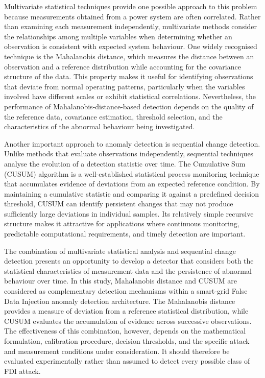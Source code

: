\documentclass[12pt,a4paper]{report}
\begin{document}
Multivariate statistical techniques provide one possible approach to this problem because
measurements obtained from a power system are often correlated. Rather than examining each
measurement independently, multivariate methods consider the relationships among multiple
variables when determining whether an observation is consistent with expected system behaviour.
One widely recognised technique is the Mahalanobis distance, which measures the distance
between an observation and a reference distribution while accounting for the covariance
structure of the data. This property makes it useful for identifying observations that
deviate from normal operating patterns, particularly when the variables involved have different
scales or exhibit statistical correlations. Nevertheless, the performance of Mahalanobis-distance-based
detection depends on the quality of the reference data, covariance estimation, threshold
selection, and the characteristics of the abnormal behaviour being investigated.

Another important approach to anomaly detection is sequential change detection. Unlike methods
that evaluate observations independently, sequential techniques analyse the evolution of a
detection statistic over time. The Cumulative Sum (CUSUM) algorithm is a well-established
statistical process monitoring technique that accumulates evidence of deviations from an
expected reference condition. By maintaining a cumulative statistic and comparing it against
a predefined decision threshold, CUSUM can identify persistent changes that may not produce
sufficiently large deviations in individual samples. Its relatively simple recursive structure
makes it attractive for applications where continuous monitoring, predictable computational
requirements, and timely detection are important.

The combination of multivariate statistical analysis and sequential change detection presents
an opportunity to develop a detector that considers both the statistical characteristics of
measurement data and the persistence of abnormal behaviour over time. In this study, Mahalanobis
distance and CUSUM are considered as complementary detection mechanisms within a smart-grid
False Data Injection anomaly detection architecture. The Mahalanobis distance provides a
measure of deviation from a reference statistical distribution, while CUSUM evaluates the
accumulation of evidence across successive observations. The effectiveness of this combination,
however, depends on the mathematical formulation, calibration procedure, decision thresholds,
and the specific attack and measurement conditions under consideration. It should therefore
be evaluated experimentally rather than assumed to detect every possible class of FDI attack.
\end{document}
